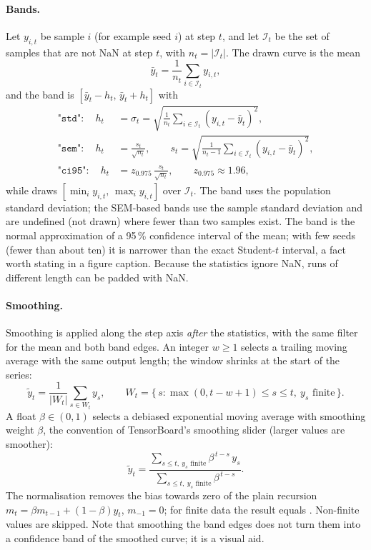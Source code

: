 \paragraph{Bands.}
Let $y_{i,t}$ be sample $i$ (for example seed $i$) at step $t$, and let
$\mathcal{I}_t$ be the set of samples that are not NaN at step $t$, with
$n_t = |\mathcal{I}_t|$. The drawn curve is the mean
\begin{equation}
  \bar{y}_t = \frac{1}{n_t} \sum_{i \in \mathcal{I}_t} y_{i,t},
\end{equation}
and the band is $[\bar{y}_t - h_t,\, \bar{y}_t + h_t]$ with
\begin{align}
  \texttt{"std"}:\quad  h_t &= \sigma_t = \sqrt{\frac{1}{n_t}\sum_{i \in \mathcal{I}_t} (y_{i,t} - \bar{y}_t)^2}, \\
  \texttt{"sem"}:\quad  h_t &= \frac{s_t}{\sqrt{n_t}}, \qquad
     s_t = \sqrt{\frac{1}{n_t - 1}\sum_{i \in \mathcal{I}_t} (y_{i,t} - \bar{y}_t)^2}, \\
  \texttt{"ci95"}:\quad h_t &= z_{0.975}\,\frac{s_t}{\sqrt{n_t}}, \qquad z_{0.975} \approx 1.96,
\end{align}
while  draws $[\min_{i} y_{i,t},\, \max_{i} y_{i,t}]$ over
$\mathcal{I}_t$. The  band uses the population standard deviation;
the SEM-based bands use the sample standard deviation and are undefined (not
drawn) where fewer than two samples exist. The  band is the
normal approximation of a 95\,\% confidence interval of the mean; with few
seeds (fewer than about ten) it is narrower than the exact Student-$t$
interval, a fact worth stating in a figure caption. Because the statistics
ignore NaN, runs of different length can be padded with NaN.

\paragraph{Smoothing.}
Smoothing is applied along the step axis \emph{after} the statistics, with the
same filter for the mean and both band edges. An integer $w \geq 1$ selects a
trailing moving average with the same output length; the window shrinks at
the start of the series:
\begin{equation}
  \tilde{y}_t = \frac{1}{|W_t|} \sum_{s \in W_t} y_s, \qquad
  W_t = \{\, s : \max(0, t - w + 1) \le s \le t,\ y_s \text{ finite} \,\}.
\end{equation}
A float $\beta \in (0, 1)$ selects a debiased exponential moving average with
smoothing weight $\beta$, the convention of TensorBoard's smoothing slider
(larger values are smoother):
\begin{equation}
  \tilde{y}_t = \frac{\sum_{s \le t,\ y_s \text{ finite}} \beta^{\,t-s}\, y_s}
                     {\sum_{s \le t,\ y_s \text{ finite}} \beta^{\,t-s}} .
\end{equation}
The normalisation removes the bias towards zero of the plain recursion
$m_t = \beta m_{t-1} + (1-\beta) y_t$, $m_{-1} = 0$; for finite data the
result equals . Non-finite
values are skipped. Note that smoothing the band edges does not turn them into a
confidence band of the smoothed curve; it is a visual aid.

